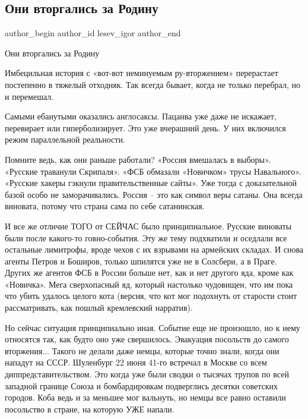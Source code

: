  
 
 
 
 
 
\subsection{Они вторгались за Родину}
\label{sec:30_01_2022.tg.lesev_igor.1.oni_vtorgalis_za_rodinu}
 
\ifcmt
 author_begin
   author_id lesev_igor
 author_end
\fi

Они вторгались за Родину

Имбецильная история с «вот-вот неминуемым ру-вторжением» перерастает постепенно
в тяжелый отходняк. Так всегда бывает, когда не только перебрал, но и
перемешал.

Самыми ебанутыми оказались англосаксы. Пацанва уже даже не искажает, перевирает
или гиперболизирует. Это уже вчерашний день. У них включился режим параллельной
реальности.

Помните ведь, как они раньше работали? «Россия вмешалась в выборы». «Русские
траванули Скрипаля». «ФСБ обмазали «Новичком» трусы Навального». «Русские
хакеры гэкнули правительственные сайты». Уже тогда с доказательной базой особо
не заморачивались. Россия – это как символ веры сатаны. Она всегда виновата,
потому что страна сама по себе сатанинская.

И все же отличие ТОГО от СЕЙЧАС было принципиальное. Русские виноваты были
после какого-то говно-события. Эту же тему подхватили и оседлали все остальные
лимитрофы, вроде чехов с их взрывами на армейских складах. И снова агенты
Петров и Боширов, только шпилятся уже не в Солсбери, а в Праге. Других же
агентов ФСБ в России больше нет, как и нет другого яда, кроме как «Новичка».
Мега сверхопасный яд, который настолько чудовищен, что им пока что убить
удалось целого кота (версия, что кот мог подохнуть от старости стоит
рассматривать, как пошлый кремлевский нарратив).

Но сейчас ситуация принципиально иная. Событие еще не произошло, но к нему
относятся так, как будто оно уже свершилось. Эвакуация посольств до самого
вторжения... Такого не делали даже немцы, которые точно знали, когда они нападут
на СССР. Шуленбург 22 июня 41-го встречал в Москве со всем
диппредставительством. Это когда уже были сводки о тысячах трупов по всей
западной границе Союза и бомбардировкам подверглись десятки советских городов.
Коба ведь и за меньшее мог вальнуть, но немцы все равно оставили посольство в
стране, на которую УЖЕ напали.

